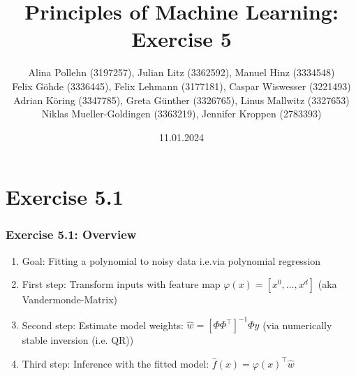 \documentclass[10pt,aspectratio=169,handout]{beamer}
\begin{document}
\title{Principles of Machine Learning: Exercise 5}
\date{11.01.2024}
\author{Alina Pollehn (3197257), Julian Litz (3362592), Manuel Hinz (3334548)\\
    Felix Göhde (3336445), Felix Lehmann (3177181), Caspar Wiswesser (3221493)\\
    Adrian Köring (3347785), Greta Günther (3326765), Linus Mallwitz (3327653)\\
    Niklas Mueller-Goldingen (3363219), Jennifer Kroppen (2783393)}

\begin{frame}
    \maketitle
\end{frame}

\section{Exercise 5.1}

\begin{frame}

    \frametitle{Exercise 5.1: Overview}

    \begin{enumerate}
        \item Goal: Fitting a polynomial to noisy data i.e.via polynomial regression
        \item First step: Transform inputs with feature map $\varphi(x) = [x^0, \dots, x^d]$ {\scriptsize (aka Vandermonde-Matrix)}
        \item Second step: Estimate model weights: $\hat{w}=[\Phi\Phi^\intercal]^{-1}\Phi y$ {\scriptsize (via numerically stable inversion (i.e. QR))}
        \item Third step: Inference with the fitted model: $\hat{f}(x)=\varphi(x)^\intercal \hat{w}$
    \end{enumerate}
\end{frame}
\end{document}
